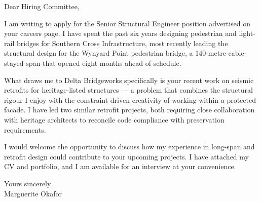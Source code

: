 \documentclass[a4paper,english]{friggeri-letter}
\begin{document}

\address{
   58 Ferngully Road \\
   Auckland 1010, New Zealand
}


\opening{Dear Hiring Committee,}

I am writing to apply for the Senior Structural Engineer position
advertised on your careers page. I have spent the past six years
designing pedestrian and light-rail bridges for Southern Cross
Infrastructure, most recently leading the structural design for the
Wynyard Point pedestrian bridge, a 140-metre cable-stayed span that
opened eight months ahead of schedule.

What draws me to Delta Bridgeworks specifically is your recent work on
seismic retrofits for heritage-listed structures --- a problem that
combines the structural rigour I enjoy with the constraint-driven
creativity of working within a protected facade. I have led two similar
retrofit projects, both requiring close collaboration with heritage
architects to reconcile code compliance with preservation requirements.

I would welcome the opportunity to discuss how my experience in
long-span and retrofit design could contribute to your upcoming projects.
I have attached my CV and portfolio, and I am available for an interview
at your convenience.

\closing{
   Yours sincerely\\
   Marguerite Okafor}
\end{document}
